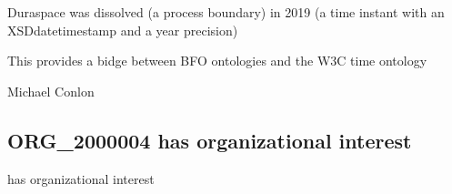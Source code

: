 \documentclass[letterpaper,10pt,english]{sphinxmanual}
\begin{document}
\begin{sphinxShadowBox}

\sphinxAtStartPar
{}
\end{sphinxShadowBox}

\begin{sphinxShadowBox}

\sphinxAtStartPar
Duraspace was dissolved (a process boundary) in 2019 (a time instant with an XSDdatetimestamp and a year precision)
\end{sphinxShadowBox}

\begin{sphinxShadowBox}

\sphinxAtStartPar
This provides a bidge between BFO ontologies and the W3C time ontology
\end{sphinxShadowBox}

\begin{sphinxShadowBox}

\sphinxAtStartPar
{}
\end{sphinxShadowBox}

\begin{sphinxShadowBox}

\sphinxAtStartPar
Michael Conlon 
\end{sphinxShadowBox}
\begin{quote}

\ignorespaces \end{quote}


\subsection{ORG\_2000004 \sphinxhyphen{} has organizational interest}
\label{\detokenize{doc-ORG_2000004:org-2000004-has-organizational-interest}}\label{\detokenize{doc-ORG_2000004:index-0}}\label{\detokenize{doc-ORG_2000004::doc}}
\begin{sphinxShadowBox}

\sphinxAtStartPar
has organizational interest
\end{sphinxShadowBox}
\end{document}
